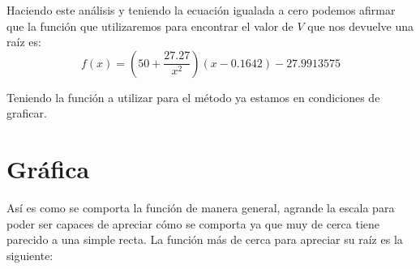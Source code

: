 \documentclass{article}
\begin{document}
Haciendo este análisis y teniendo la ecuación igualada a cero podemos afirmar que la función que utilizaremos para encontrar el valor de $V$ que nos devuelve una raíz es:
$$f(x) = (50+\frac{27.27}{x^2})(x-0.1642)-27.9913575$$




Teniendo la función a utilizar para el método ya estamos en condiciones de graficar.


\section{Gráfica}


\begin{figure}[h]
   \centering
  
\end{figure}


Así es como se comporta la función de manera general, agrande la escala para poder ser capaces de apreciar cómo se comporta ya que muy de cerca tiene parecido a una simple recta.
La función más de cerca para apreciar su raíz es la siguiente:
      
\begin{figure}[h]
   \centering
\end{figure}
\end{document}
